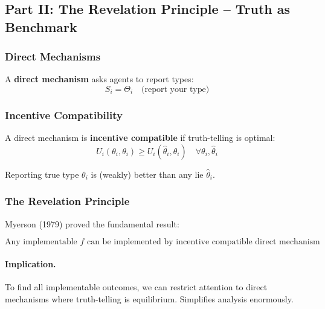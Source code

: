 \subsection{Part II: The Revelation Principle – Truth as Benchmark}

\subsubsection{Direct Mechanisms}

A \textbf{direct mechanism} asks agents to report types:
\begin{equation}
S_i = \Theta_i \quad \text{(report your type)}
\end{equation}

\subsubsection{Incentive Compatibility}

A direct mechanism is \textbf{incentive compatible} if truth-telling is optimal:
\begin{equation}
\boxed{
U_i(\theta_i, \theta_i) \geq U_i(\hat{\theta}_i, \theta_i) \quad \forall \theta_i, \hat{\theta}_i
}
\label{eq:ic}
\end{equation}

Reporting true type $\theta_i$ is (weakly) better than any lie $\hat{\theta}_i$.

\subsubsection{The Revelation Principle}

Myerson (1979) proved the fundamental result:

\begin{equation}
\boxed{
\text{Any implementable } f \text{ can be implemented by incentive compatible direct mechanism}
}
\label{eq:revelation}
\end{equation}

\paragraph{Implication.}
To find all implementable outcomes, we can restrict attention to direct 
mechanisms where truth-telling is equilibrium. Simplifies analysis enormously.

